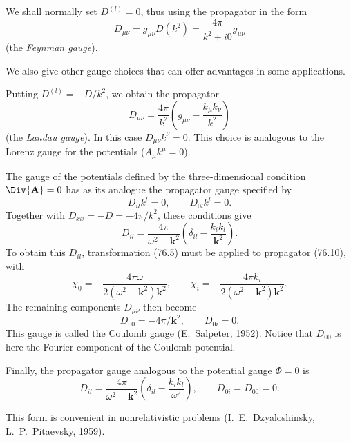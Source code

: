 We shall normally set $D^{(l)}=0$, thus using the propagator in the form
\begin{equation}
D_{\mu\nu}=g_{\mu\nu}D(k^2)=\frac{4\pi}{k^2+i0}g_{\mu\nu}
\tag{76.10}
\end{equation}
(the \emph{Feynman gauge}).

We also give other gauge choices that can offer advantages in some applications.

Putting $D^{(l)}=-D/k^2$, we obtain the propagator
\begin{equation}
D_{\mu\nu}=\frac{4\pi}{k^2}\left(g_{\mu\nu}-\frac{k_\mu k_\nu}{k^2}\right)
\tag{76.11}
\end{equation}
(the \emph{Landau gauge}). In this case $D_{\mu\nu}k^\nu=0$. This choice is analogous to the Lorenz gauge for the potentials ($A_\mu k^\mu=0$).

The gauge of the potentials defined by the three-dimensional condition $\Div{\mathbf A}=0$ has as its analogue the propagator gauge specified by
\[
D_{il}k^l=0,\qquad D_{0l}k^l=0.
\]
Together with $D_{xx}=-D=-4\pi/k^2$, these conditions give
\begin{equation}
D_{il}=\frac{4\pi}{\omega^2-\mathbf k^2}
\left(\delta_{il}-\frac{k_i k_l}{\mathbf k^2}\right).
\tag{76.12}
\end{equation}
To obtain this $D_{il}$, transformation (76.5) must be applied to propagator (76.10), with
\[
\chi_0=-\frac{4\pi\omega}{2(\omega^2-\mathbf k^2)\mathbf k^2},
\qquad
\chi_i=-\frac{4\pi k_i}{2(\omega^2-\mathbf k^2)\mathbf k^2}.
\]
The remaining components $D_{\mu\nu}$ then become
\begin{equation}
D_{00}=-4\pi/\mathbf k^2,\qquad D_{0i}=0.
\tag{76.13}
\end{equation}
This gauge is called the Coulomb gauge (E.~Salpeter, 1952). Notice that $D_{00}$ is here the Fourier component of the Coulomb potential.

Finally, the propagator gauge analogous to the potential gauge $\Phi=0$ is
\begin{equation}
D_{il}=\frac{4\pi}{\omega^2-\mathbf k^2}
\left(\delta_{il}-\frac{k_i k_l}{\omega^2}\right),
\qquad D_{0i}=D_{00}=0.
\tag{76.14}
\end{equation}

This form is convenient in nonrelativistic problems (I.~E.~Dzyaloshinsky, L.~P.~Pitaevsky, 1959).

